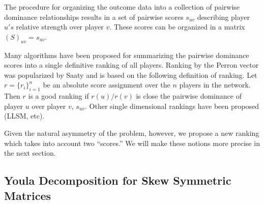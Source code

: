 \documentclass[a4,11pt,twoside,leqno]{report}
\theoremstyle{definition}
\theoremstyle{remark}
\numberwithin{equation}{section}
\begin{document}
The procedure for organizing the outcome data into a collection of pairwise
dominance relationships results in a set of pairwise scores $s_{uv}$ describing
player $u's$ relative strength over player $v$.  These scores can be organized
in a matrix $(S)_{uv} = s_{uv}$.

Many algorithms have been proposed for summarizing the pairwise dominance scores
into a single definitive ranking of all players.  Ranking by the Perron vector
was popularized by Saaty and is based on the following definition of ranking.
Let $r = \{r_i\}_{i=1}^n$ be an absolute score assignment over the $n$ players
in the network.  Then $r$ is a good ranking if $r(u)/r(v)$ is close the pairwise
dominance of player $u$ over player $v$, $s_{uv}$.  Other single dimensional
rankings have been proposed (LLSM, etc).

Given the natural asymmetry of the problem, however, we propose a new ranking
which takes into account two ``scores.'' We will make these notions more precise
in the next section.

\subsection{Youla Decomposition for Skew Symmetric Matrices}
\end{document}

